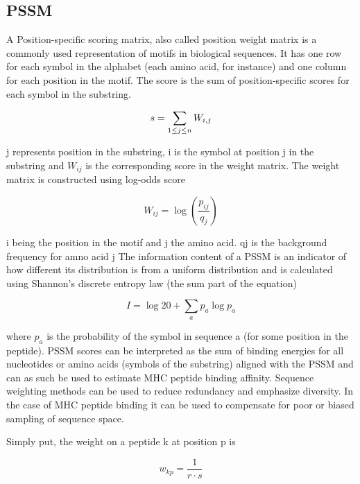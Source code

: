 
\subsection*{PSSM}
A Position-specific scoring matrix, also called position weight matrix is a commonly used representation of motifs in biological sequences. It has one row for each symbol in the alphabet (each amino acid, for instance) and one column for each position in the motif. The score is the sum of position-specific scores for each symbol in the substring.

\begin{equation}
s = \sum_{1\leq j\leq n}{W_{i,j}} \\
\end{equation}

j represents position in the substring, i is the symbol at position j in the substring and $W_{ij}$ is the corresponding score in the weight matrix. The weight matrix is constructed using log-odds score

\begin{equation}
W_{ij} = \log{ (\frac{p_{ij}}{q_j}) }
\end{equation}

i being the position in the motif and j the amino acid. qj is the background frequency for amno acid j
The information content of a PSSM is an indicator of how different its distribution is from a uniform distribution and is calculated using Shannon's discrete entropy law (the sum part of the equation)

\begin{equation}
\label{info}
I = \log{ 20 } + \sum_{a}{ p_{a}\log{p_{a}} }
\end{equation}

where $p_a$ is the probability of the symbol in sequence a (for some position in the peptide).
PSSM scores can be interpreted as the sum of binding energies for all nucleotides or amino acids (symbols of the substring) aligned with the PSSM and can as such be used to estimate MHC peptide binding affinity.
Sequence weighting methods can be used to reduce redundancy and emphasize diversity. In the case of MHC peptide binding it can be used to compensate for poor or biased sampling of sequence space.

Simply put, the weight on a peptide k at position p is

\begin{equation}
w_{kp} = \frac{1}{r\cdot s}
\end{equation}

